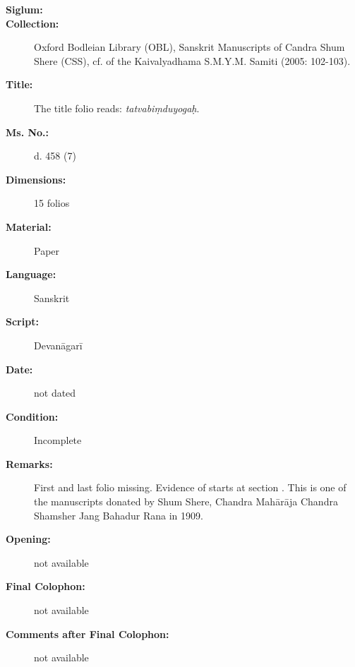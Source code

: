 \newpage
\begin{description}
\item[\textbf{Siglum:}] \Huge{} \nocite{ytbb}
\item[\textbf{Collection:}] Oxford Bodleian Library (OBL), Sanskrit Manuscripts of Candra Shum Shere (CSS), cf.  of the Kaivalyadhama S.M.Y.M. Samiti (2005: 102-103). 
\item[\textbf{Title:}] The title folio reads: \textit{tatvabiṃduyogaḥ}. 
\item[\textbf{Ms. No.:}] d. 458 (7) 
\item[\textbf{Dimensions:}] 15 folios 
\item[\textbf{Material:}] Paper
\item[\textbf{Language:}] Sanskrit
\item[\textbf{Script:}] Devanāgarī
\item[\textbf{Date:}] not dated
\item[\textbf{Condition:}] Incomplete
\item[\textbf{Remarks:}] First and last folio missing. Evidence of  starts at section . This is one of the manuscripts donated by Shum Shere, Chandra Mahārāja Chandra Shamsher Jang Bahadur Rana in 1909. 
\item[\textbf{Opening:}] not available 
\item[\textbf{Final Colophon:}] not available 
\item[\textbf{Comments after Final Colophon:}] not available
\end{description}
\newpage

